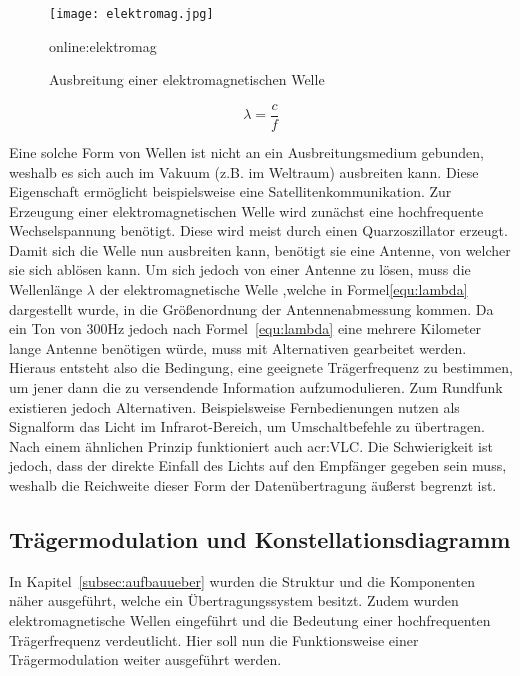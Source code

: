 \begin{figure}[H]
	\centering
	\texttt{[image: elektromag.jpg]}
	\caption[Ausbreitung einer elektromagnetischen Welle]{Ausbreitung einer elektromagnetischen Welle} 
	\gls{online:elektromag}
	\label{fig:elektromag}
\end{figure}
\begin{equation}
	\label{equ:lambda}
	\lambda = \frac{c}{f} 
\end{equation}

Eine solche Form von Wellen ist nicht an ein Ausbreitungsmedium gebunden, weshalb es sich auch im Vakuum (z.B. im Weltraum) ausbreiten kann. Diese Eigenschaft ermöglicht beispielsweise eine Satellitenkommunikation. Zur Erzeugung einer elektromagnetischen Welle wird zunächst eine hochfrequente Wechselspannung benötigt. Diese wird meist durch einen Quarzoszillator erzeugt. Damit sich die Welle nun ausbreiten kann, benötigt sie eine Antenne, von welcher sie sich ablösen kann.\cite{howwireless}\cite{wernerNachrichtentechnikEinfuehrungFuer2010} Um sich jedoch von einer Antenne zu lösen, muss die Wellenlänge $\lambda$  der elektromagnetische Welle ,welche in Formel\ref{equ:lambda} dargestellt wurde, in die Größenordnung der Antennenabmessung kommen. Da ein Ton von 300Hz jedoch nach Formel~\ref{equ:lambda} eine mehrere Kilometer lange Antenne benötigen würde, muss mit Alternativen gearbeitet werden. Hieraus entsteht also die Bedingung, eine geeignete Trägerfrequenz zu bestimmen, um jener dann die zu versendende Information aufzumodulieren.\cite{heuermannHochfrequenztechnikKomponentenFuer2018}\cite{hoeher} Zum Rundfunk existieren jedoch Alternativen. Beispielsweise Fernbedienungen nutzen als Signalform das Licht im Infrarot-Bereich, um Umschaltbefehle zu übertragen. Nach einem ähnlichen Prinzip funktioniert auch \gls{acr:VLC}. Die Schwierigkeit ist jedoch, dass der direkte Einfall des Lichts auf den Empfänger gegeben sein muss, weshalb die Reichweite dieser Form der Datenübertragung äußerst begrenzt ist.

\subsection{Trägermodulation und Konstellationsdiagramm}
\label{subsec:modulationsarten}

In Kapitel~\ref{subsec:aufbauueber} wurden die Struktur und die Komponenten näher ausgeführt, welche ein Übertragungssystem besitzt. Zudem wurden elektromagnetische Wellen eingeführt und die Bedeutung einer hochfrequenten Trägerfrequenz verdeutlicht. Hier soll nun die Funktionsweise einer Trägermodulation weiter ausgeführt werden.  

